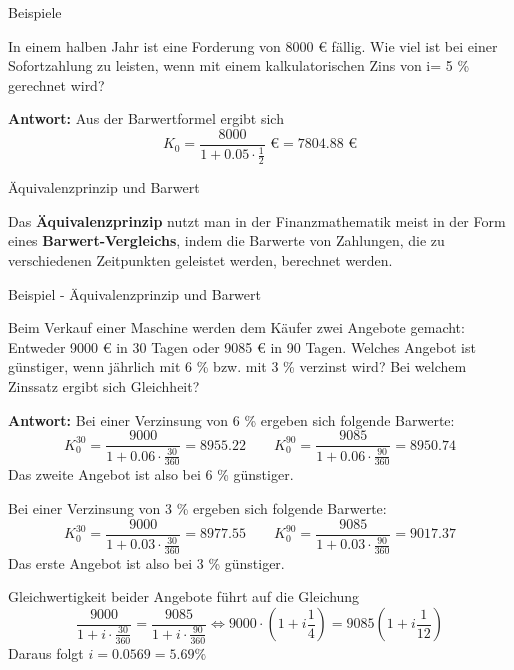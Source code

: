 \begin{frame}{Beispiele}
	\begin{example}
		In einem halben Jahr ist eine Forderung von 8000 € fällig. Wie viel ist bei einer Sofortzahlung zu leisten, wenn mit einem kalkulatorischen Zins von i= 5 \% gerechnet wird?
		
		\textbf{Antwort:} Aus der Barwertformel ergibt sich
		\[
			K_{0} = \frac{8000}{1+0.05 \cdot \frac{1}{2}} \mbox{ €} = 7804.88 \mbox{ €}
		\]
	\end{example}
\end{frame}

\begin{frame}{Äquivalenzprinzip und Barwert}
	\begin{bemerkung}
		Das \textbf{Äquivalenzprinzip} nutzt man in der Finanzmathematik meist in der Form eines \textbf{Barwert-Vergleichs}, indem die Barwerte von Zahlungen, die zu verschiedenen Zeitpunkten geleistet werden, berechnet werden. 
	\end{bemerkung}
\end{frame}
\begin{frame}{Beispiel - Äquivalenzprinzip und Barwert}
	\footnotesize{
		\begin{example}
		Beim Verkauf einer Maschine werden dem Käufer zwei Angebote gemacht: Entweder 9000 € in 30 Tagen oder 9085 € in 90 Tagen. Welches Angebot ist günstiger, wenn jährlich mit 6 \% bzw. mit 3 \% verzinst wird? Bei welchem Zinssatz ergibt sich Gleichheit?
		
		\textbf{Antwort:}
		Bei einer Verzinsung von 6 \% ergeben sich folgende Barwerte:
		\[
			K_{0}^{30} = \frac{9000}{1+0.06 \cdot \frac{30}{360}} = 8955.22 \qquad 			K_{0}^{90} = \frac{9085}{1+0.06 \cdot \frac{90}{360}} = 8950.74  
		\] 
		Das zweite Angebot ist also bei 6 \% günstiger.
		
		Bei einer Verzinsung von 3 \% ergeben sich folgende Barwerte:
		\[
		K_{0}^{30} = \frac{9000}{1+0.03 \cdot \frac{30}{360}} = 8977.55 \qquad 			K_{0}^{90} = \frac{9085}{1+0.03 \cdot \frac{90}{360}} = 9017.37  
		\] 
		Das erste Angebot ist also bei 3 \% günstiger.

		Gleichwertigkeit beider Angebote führt auf die Gleichung 
		\[
		\frac{9000}{1+i \cdot \frac{30}{360}} = \frac{9085}{1+i \cdot \frac{90}{360}} \Leftrightarrow 9000 \cdot \left( 1 + i \frac{1}{4} \right) = 9085 \left( 1 + i \frac{1}{12} \right) 	
		\]
		Daraus folgt $i = 0.0569 = 5.69 \%$ 
	\end{example}}
\end{frame}


